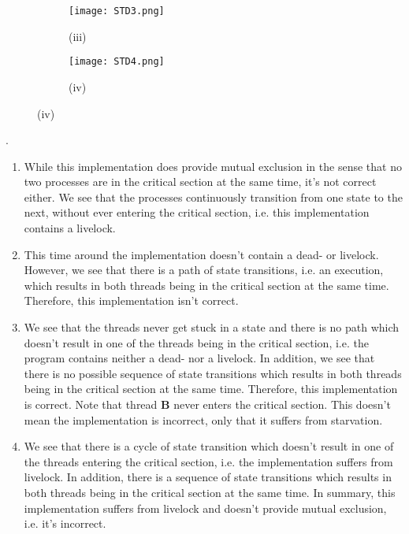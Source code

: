 \documentclass[main]{subfiles}
\begin{document}
\begin{ExerciseList}
            \begin{figure}[H]
                \centering
                \begin{subfigure}{.5\textwidth}
                    \centering
                    \texttt{[image: STD3.png]}
                    \captionsetup{labelformat=empty}
                    \caption{(iii)}
                \end{subfigure}%
                \begin{subfigure}{.5\textwidth}
                    \centering
                    \texttt{[image: STD4.png]}
                    \captionsetup{labelformat=empty}
                    \caption{(iv)}
                \end{subfigure}
            \end{figure}
            
        \Answer[ref={MEI}].\quad \\
        \begin{enumerate}[label=(\roman*)]
            \item \quad While this implementation does provide mutual exclusion in the sense that no two processes are in the critical section at the same time, it's not correct either. We see that the processes continuously transition from one state to the next, without ever entering the critical section, i.e. this implementation contains a livelock.
            \item \quad This time around the implementation doesn't contain a dead- or livelock. However, we see that there is a path of state transitions, i.e. an execution, which results in both threads being in the critical section at the same time. Therefore, this implementation isn't correct.
            \item \quad We see that the threads never get stuck in a state and there is no path which doesn't result in one of the threads being in the critical section, i.e. the program contains neither a dead- nor a livelock. In addition, we see that there is no possible sequence of state transitions which results in both threads being in the critical section at the same time. Therefore, this implementation is correct. Note that thread \textbf{B} never enters the critical section. This doesn't mean the implementation is incorrect, only that it suffers from starvation.
            \item \quad We see that there is a cycle of state transition which doesn't result in one of the threads entering the critical section, i.e. the implementation suffers from livelock. In addition, there is a sequence of state transitions which results in both threads being in the critical section at the same time. In summary, this implementation suffers from livelock and doesn't provide mutual exclusion, i.e. it's incorrect.
        \end{enumerate}
        

\end{ExerciseList}
\end{document}
